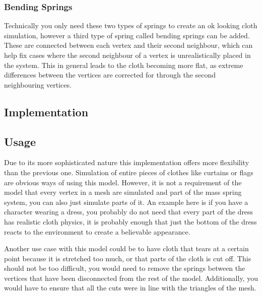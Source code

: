 \subsubsection{Bending Springs}
Technically you only need these two types of springs to create an ok looking cloth simulation,
however a third type of spring called bending springs can be added.
These are connected between each vertex and their second neighbour,
which can help fix cases where the second neighbour of a vertex is unrealistically placed in the system.
This in general leads to the cloth becoming more flat, as extreme differences between the vertices are corrected for
through the second neighbouring vertices.

%

\subsection{Implementation}

\subsection{Usage}
Due to its more sophisticated nature this implementation offers more flexibility than the previous one.
Simulation of entire pieces of clothes like curtains or flags are obvious ways of using this model.
However, it is not a requirement of the model that every vertex in a mesh are simulated and part of the mass spring system, you can also just simulate parts of it.
An example here is if you have a character wearing a dress, you probably do not need that every part of the dress
has realistic cloth physics, it is probably enough that just the bottom of the dress reacts to the environment
to create a believable appearance.

Another use case with this model could be to have cloth that tears at a certain point because it is stretched too much,
or that parts of the cloth is cut off. This should not be too difficult, you would need to remove the springs between
the vertices that have been disconnected from the rest of the model.
Additionally, you would have to ensure that all the cuts were in line with the triangles of the mesh.

